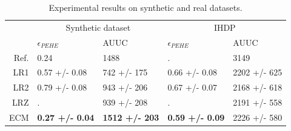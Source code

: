 \begin{table}[!ht]
    \begin{center}
        \begin{tabular}{rllll}
            \hline 
            & \multicolumn{2}{c}{Synthetic dataset} & \multicolumn{2}{c}{IHDP}\\
               & $\epsilon_{PEHE}$ & AUUC
             & $\epsilon_{PEHE}$ & AUUC\\
            \hline
                  Ref.
                & 0.24 
                & 1488 
                & .
                & 3149 
                \\ \hdashline
                 LR1
                & 0.57 +/- 0.08 
                & 742 +/- 175
                & 0.66 +/- 0.08
                & 2202 +/- 625\\
                 LR2
                & 0.79 +/- 0.08
                & 943 +/- 206
                & 0.67 +/- 0.07
                & 2168 +/- 618\\
                 LRZ
                & .
                & 939 +/- 208
                & .
                & 2191 +/- 558 \\
                 ECM
                & \textbf{0.27 +/- 0.04}
                & \textbf{1512 +/- 203}
                & \textbf{0.59 +/- 0.09}
                & 2226 +/- 580\\
            \hline 
        \end{tabular}
    \end{center}
    \label{tab:results}
    \caption{Experimental results on synthetic and real datasets.}
    
\end{table}



